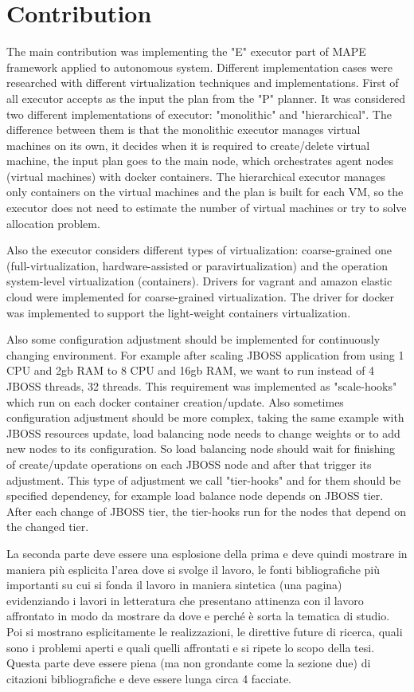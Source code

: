 \section{Contribution}
The main contribution was implementing the "E" executor part of MAPE framework applied to autonomous system. Different implementation cases were researched with different virtualization techniques and implementations.
First of all executor accepts as the input the plan from the  "P" planner. It was considered two different implementations of executor: "monolithic" and "hierarchical". The difference between them is that the monolithic executor manages virtual machines on its own, it decides when it is required to create/delete virtual machine, the input plan goes to the main node, which orchestrates agent nodes (virtual machines) with docker containers. The hierarchical executor manages only containers on the virtual machines and the plan is built for each VM, so the executor does not need to estimate the number of virtual machines or try to solve allocation problem.

Also the executor considers different types of virtualization: coarse-grained one (full-virtualization, hardware-assisted or paravirtualization) and the operation system-level virtualization (containers). Drivers for vagrant and amazon elastic cloud were implemented for coarse-grained virtualization. The driver for docker was implemented to support the light-weight containers virtualization.

Also some configuration adjustment should be implemented for continuously changing environment. For example after scaling JBOSS application from using 1 CPU and 2gb RAM to 8 CPU and 16gb RAM, we want to run instead of 4 JBOSS threads, 32 threads. This requirement was implemented as "scale-hooks" which run on each docker container creation/update. Also sometimes configuration adjustment should be more complex, taking the same example with JBOSS resources update, load balancing node needs to change weights or to add new nodes to its configuration. So load balancing node should wait for finishing of create/update operations on each JBOSS node and after that trigger its adjustment. This type of adjustment we call "tier-hooks" and for them should be specified dependency, for example load balance node depends on JBOSS tier. After each change of JBOSS tier, the tier-hooks run for the nodes that depend on the changed tier.


La seconda parte deve essere una esplosione della prima e deve quindi mostrare in maniera pi\`u esplicita l'area dove si svolge il lavoro, le fonti bibliografiche pi\`u importanti su cui si fonda il lavoro in maniera sintetica (una pagina) evidenziando i lavori in letteratura che presentano attinenza con il lavoro affrontato in modo da mostrare da dove e perch\'e \`e sorta la tematica di studio. Poi si mostrano esplicitamente le realizzazioni, le direttive future di ricerca, quali sono i problemi aperti e quali quelli affrontati e si ripete lo scopo della tesi. Questa parte deve essere piena (ma non grondante come la sezione due) di citazioni bibliografiche e deve essere lunga circa 4 facciate.
\fi

